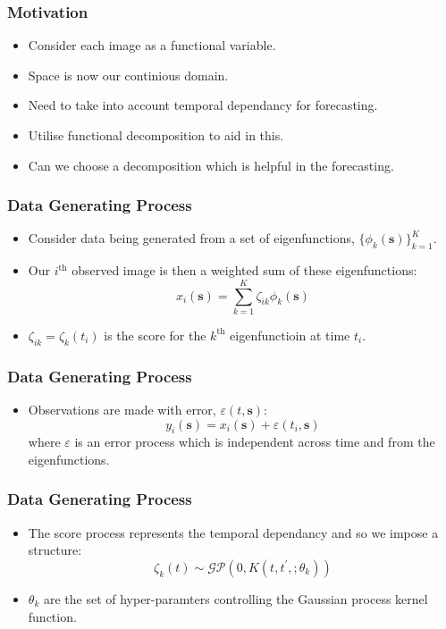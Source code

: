 \documentclass[aspectratio=169]{beamer}
\newcommand{\ve}[1]{\bm{{#1}}}
\begin{document}
  \begin{frame}
    \frametitle{Motivation}
    \begin{itemize}
      \item Consider each image as a functional variable.
      \item Space is now our continious domain. 
      \item Need to take into account temporal dependancy for forecasting.
      \item Utilise functional decomposition to aid in this. 
      \item Can we choose a decomposition which is helpful in the forecasting. 
    \end{itemize}
  \end{frame}

  \begin{frame}
    \frametitle{Data Generating Process}
    \begin{itemize}
      \item Consider data being generated from a set of eigenfunctions, $\{\phi_k(\ve{s})\}_{k=1}^K$. 
      \item Our $i^\text{th}$ observed image is then a weighted sum of these eigenfunctions: 
        \begin{equation}
          x_i(\ve{s}) = \sum_{k=1}^K \zeta_{ik} \phi_k(\ve{s})
          \label{eqn:ef}
        \end{equation}
      \item $\zeta_{ik} = \zeta_k(t_i)$ is the score for the $k^\text{th}$ eigenfunctioin at time $t_i$.
    \end{itemize}
  \end{frame}

  \begin{frame}
    \frametitle{Data Generating Process}
    \begin{itemize}
      \item Observations are made with error, $\varepsilon(t, \ve{s})$:
        \begin{equation}
          y_i(\ve{s}) = x_i(\ve{s}) + \varepsilon(t_i, \ve{s})
          \label{eqn:ef_err}
        \end{equation}
        where $\varepsilon$ is an error process which is independent across time and from the eigenfunctions. 
    \end{itemize}
  \end{frame}

  \begin{frame}
    \frametitle{Data Generating Process}
    \begin{itemize}
      \item The score process represents the temporal dependancy and so we impose a structure:
        \begin{equation}
          \zeta_k(t) \sim \mathcal{GP}\left( 0, K(t, t^\prime, ; \theta_k) \right)
          \label{eqnLscores}
        \end{equation}
      \item $\theta_k$ are the set of hyper-paramters controlling the Gaussian process kernel function.
    \end{itemize}
  \end{frame}
\end{document}
